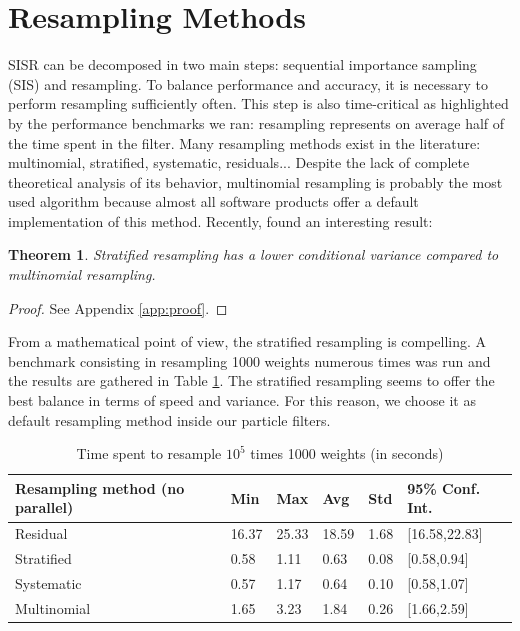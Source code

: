 \documentclass[11pt,a4,twosided,singlespacing,titlepagenumber=on]{scrreprt}
\numberwithin{equation}{chapter} %
\newtheorem{theorem}{Theorem}%
\theoremstyle{remark}
\begin{document}
\section{Resampling Methods}
SISR can be decomposed in two main steps: sequential importance sampling (SIS) and resampling. To balance performance and accuracy, it is necessary to perform resampling sufficiently often. This step is also time-critical as highlighted by the performance benchmarks we ran: resampling represents on average half of the time spent in the filter. Many resampling methods exist in the literature: multinomial, stratified, systematic, residuals... Despite the lack of complete theoretical analysis of its behavior, multinomial resampling is probably the most used algorithm because almost all software products offer a default implementation of this method. Recently, \cite{douc2005} found an interesting result:
\begin{theorem}
\textit{
Stratified resampling has a lower conditional variance compared to multinomial resampling.
}
\end{theorem}
\begin{proof}
See Appendix \ref{app:proof}.
\end{proof}

From a mathematical point of view, the stratified resampling is compelling. A benchmark consisting in resampling 1000 weights numerous times was run and the results are gathered in Table \ref{resampling_method_table}. The stratified resampling seems to offer the best balance in terms of speed and variance. For this reason, we choose it as default resampling method inside our particle filters.

\begin{table}[H]
\centering
\begin{tabular}{llllll}
\hline
\multicolumn{1}{|l|}{Resampling method (no parallel)}     & \multicolumn{1}{l|}{Min} & \multicolumn{1}{l|}{Max} & \multicolumn{1}{l|}{Avg} & \multicolumn{1}{l|}{Std} & \multicolumn{1}{l|}{95\% Conf. Int.}\\ \hline
Residual 					   &  16.37 & 25.33 & 18.59 & 1.68 & [16.58,22.83]\\
Stratified   				 &  0.58  & 1.11  & 0.63  & 0.08 & [0.58,0.94]\\
Systematic   				 &  0.57  & 1.17  & 0.64  & 0.10 & [0.58,1.07]\\
Multinomial          &  1.65  & 3.23  & 1.84  & 0.26 & [1.66,2.59]\\
\hline
\end{tabular}
\caption{Time spent to resample $10^5$ times 1000 weights (in seconds)}
\label{resampling_method_table}
\end{table}
\end{document}
